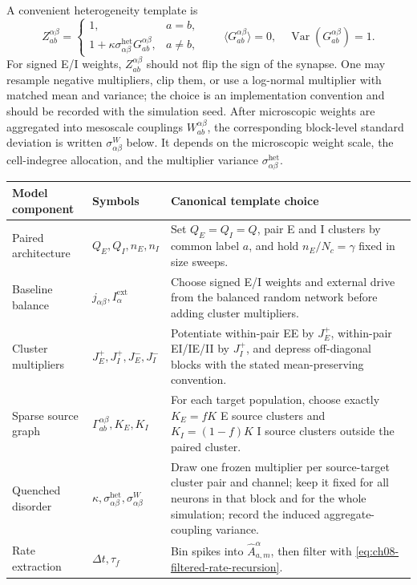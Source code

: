 A convenient heterogeneity template is
\begin{equation}
    Z_{ab}^{\alpha\beta}
    =
    \begin{cases}
      1, & a=b,\\
      1+\kappa\sigma_{\alpha\beta}^{\mathrm{het}}G_{ab}^{\alpha\beta},
      & a\ne b,
    \end{cases}
    \qquad
    \langle G_{ab}^{\alpha\beta}\rangle=0,\quad
    \operatorname{Var}(G_{ab}^{\alpha\beta})=1 .
    \label{eq:ch08-weight-heterogeneity-template}
\end{equation}
For signed E/I weights, \(Z_{ab}^{\alpha\beta}\) should not flip the sign of
the synapse. One may resample negative multipliers, clip them, or use a
log-normal multiplier with matched mean and variance; the choice is an
implementation convention and should be recorded with the simulation seed.
After microscopic weights are aggregated into mesoscale couplings
\(W_{ab}^{\alpha\beta}\), the corresponding block-level standard deviation is
written \(\sigma_{\alpha\beta}^{W}\) below. It depends on the microscopic weight
scale, the cell-indegree allocation, and the multiplier variance
\(\sigma_{\alpha\beta}^{\mathrm{het}}\).

\begin{center}
\renewcommand{\arraystretch}{1.35}
\begin{tabularx}{\textwidth}{@{}l l X@{}}
  \toprule
  \textbf{Model component} & \textbf{Symbols} & \textbf{Canonical template choice} \\
  \midrule
  Paired architecture &
  \(Q_E,Q_I,n_E,n_I\) &
  Set \(Q_E=Q_I=Q\), pair E and I clusters by common label \(a\), and hold
  \(n_E/N_c=\gamma\) fixed in size sweeps. \\
  Baseline balance &
  \(j_{\alpha\beta},I_\alpha^{\mathrm{ext}}\) &
  Choose signed E/I weights and external drive from the balanced random network
  before adding cluster multipliers. \\
  Cluster multipliers &
  \(J_E^+,J_I^+,J_E^-,J_I^-\) &
  Potentiate within-pair EE by \(J_E^+\), within-pair EI/IE/II by \(J_I^+\),
  and depress off-diagonal blocks with the stated mean-preserving convention. \\
  Sparse source graph &
  \(\Gamma_{ab}^{\alpha\beta},K_E,K_I\) &
  For each target population, choose exactly \(K_E=fK\) E source clusters and
  \(K_I=(1-f)K\) I source clusters outside the paired cluster. \\
  Quenched disorder &
  \(\kappa,\sigma_{\alpha\beta}^{\mathrm{het}},\sigma_{\alpha\beta}^{W}\) &
  Draw one frozen multiplier per source-target cluster pair and channel; keep it
  fixed for all neurons in that block and for the whole simulation; record the
  induced aggregate-coupling variance. \\
  Rate extraction &
  \(\Delta t,\tau_f\) &
  Bin spikes into \(\widehat A_{a,m}^\alpha\), then filter with
  \cref{eq:ch08-filtered-rate-recursion}. \\
  \bottomrule
\end{tabularx}
\end{center}

